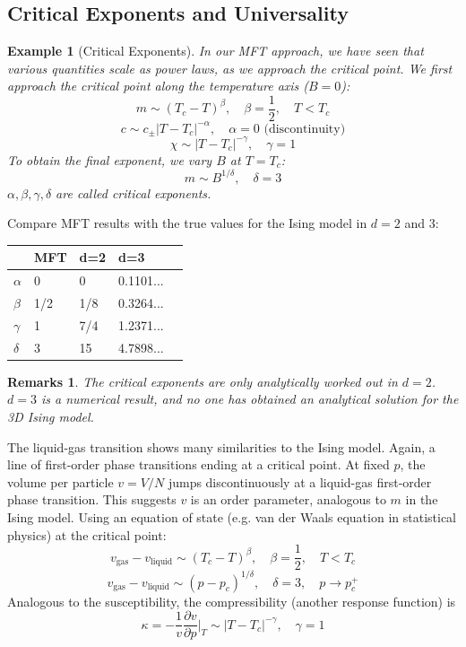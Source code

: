 \documentclass[a4paper]{article}
\newtheorem{eg}{Example}[section]
\newtheorem{remarks}{Remarks}[section]
\theoremstyle{new}
\begin{document}
\subsection{Critical Exponents and Universality}
\begin{eg}[Critical Exponents]
In our MFT approach, we have seen that various quantities scale as power laws, as we approach the critical point. We first approach the critical point along the temperature axis ($B=0$):
$$m\sim(T_c-T)^\beta,\quad\beta=\frac{1}{2},\quad T<T_c$$
$$c\sim c_\pm|T-T_c|^{-\alpha},\quad\alpha=0\text{ (discontinuity)}$$
$$\chi\sim|T-T_c|^{-\gamma},\quad\gamma=1$$
To obtain the final exponent, we vary $B$ at $T=T_c$:
$$m\sim B^{1/\delta},\quad\delta=3$$
$\alpha,\beta,\gamma,\delta$ are called critical exponents.
\end{eg}
Compare MFT results with the true values for the Ising model in $d=2$ and 3:
\begin{table}[H]
\centering
\begin{tabular}{|l|l|l|l|l|}
\hline
      & MFT & d=2 & d=3         \\
      \hline
$\alpha$ & 0   & 0   & 0.1101...   \\
 \hline
$\beta$  & 1/2 & 1/8 & 0.3264...   \\
 \hline
$\gamma$ & 1   & 7/4 & 1.2371...   \\
 \hline
$\delta$ & 3   & 15  & 4.7898...  \\
\hline
\end{tabular}
\end{table}
\begin{remarks}
The critical exponents are only analytically worked out in $d=2$. $d=3$ is a numerical result, and no one has obtained an analytical solution for the 3D Ising model.
\end{remarks}
The liquid-gas transition shows many similarities to the Ising model. Again, a line of first-order phase transitions ending at a critical point. At fixed $p$, the volume per particle $v=V/N$ jumps discontinuously at a liquid-gas first-order phase transition. This suggests $v$ is an order parameter, analogous to $m$ in the Ising model. Using an equation of state (e.g. van der Waals equation in statistical physics) at the critical point:
$$v_{\text{gas}}-v_{\text{liquid}}\sim(T_c-T)^\beta,\quad\beta=\frac{1}{2},\quad T<T_c$$
$$v_{\text{gas}}-v_{\text{liquid}}\sim(p-p_c)^{1/\delta},\quad\delta=3,\quad p\rightarrow p_c^+$$
Analogous to the susceptibility, the compressibility (another response function) is
$$\kappa=-\frac{1}{v}\frac{\partial v}{\partial p}\bigg|_T\sim|T-T_c|^{-\gamma},\quad\gamma=1$$
\end{document}
